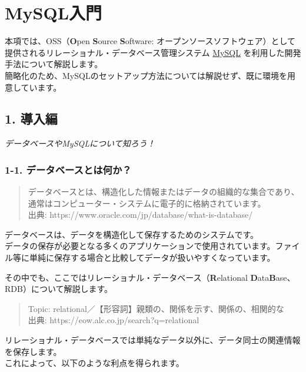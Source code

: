 \section{MySQL入門}\label{mysqlux5165ux9580}

本項では、OSS（\textbf{O}pen \textbf{S}ource \textbf{S}oftware:
オープンソースソフトウェア）として提供されるリレーショナル・データベース管理システム
\href{https://www.mysql.com/jp/}{MySQL}
を利用した開発手法について解説します。\\
簡略化のため、MySQLのセットアップ方法については解説せず、既に環境を用意しています。

\subsection{1. 導入編}\label{ux5c0eux5165ux7de8}

\emph{データベースやMySQLについて知ろう！}

\subsubsection{1-1.
データベースとは何か？}\label{ux30c7ux30fcux30bfux30d9ux30fcux30b9ux3068ux306fux4f55ux304b}

\begin{quote}
データベースとは、構造化した情報またはデータの組織的な集合であり、通常はコンピューター・システムに電子的に格納されています。\\
出典: https://www.oracle.com/jp/database/what-is-database/
\end{quote}

データベースは、データを構造化して保存するためのシステムです。\\
データの保存が必要となる多くのアプリケーションで使用されています。ファイル等に単純に保存する場合と比較してデータが扱いやすくなっています。

その中でも、ここではリレーショナル・データベース（\textbf{R}elational
\textbf{D}ata\textbf{B}ase、RDB）について解説します。

\begin{quote}
Topic: relational／【形容詞】親類の、関係を示す、関係の、相関的な\\
出典: https://eow.alc.co.jp/search?q=relational
\end{quote}

リレーショナル・データベースでは単純なデータ以外に、データ同士の関連情報を保存します。\\
これによって、以下のような利点を得られます。

